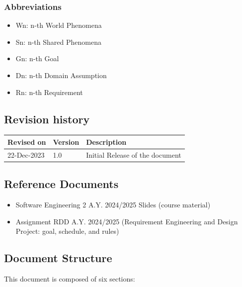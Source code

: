 \documentclass{article}
\begin{document}
\subsubsection{Abbreviations}
    \begin{itemize}
        \item Wn: n-th World Phenomena
        \item Sn: n-th Shared Phenomena
        \item Gn: n-th Goal
        \item Dn: n-th Domain Assumption
        \item Rn: n-th Requirement
    \end{itemize}
\subsection{Revision history}
\noindent
\begin{tabularx}{\textwidth}{llX}
    \toprule
    Revised on & Version & Description \\
    \midrule
    22-Dec-2023 & 1.0 & Initial Release of the document \\
    \bottomrule
\end{tabularx}
\vspace{0.33pt}
\subsection{Reference Documents}
    \begin{itemize}
        \item Software Engineering 2 A.Y. 2024/2025 Slides (course material)
        \item Assignment RDD A.Y. 2024/2025 (Requirement Engineering and Design Project: goal, schedule, and rules)
    \end{itemize}

\subsection{Document Structure}
    This document is composed of six sections:
\end{document}
